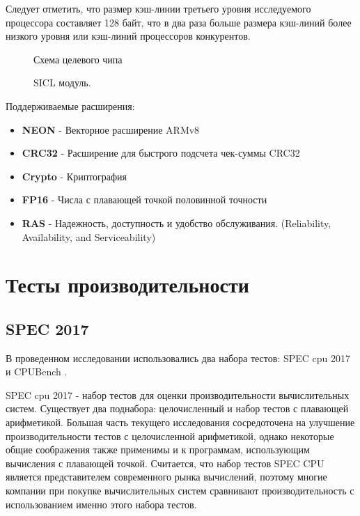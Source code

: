 Следует отметить, что размер кэш-линии третьего уровня исследуемого процессора составляет 128 байт, что в два раза больше размера кэш-линий более низкого уровня или кэш-линий процессоров конкурентов. 

\begin{figure}[htbp]
	\centering
	
	\caption{Схема целевого чипа}
	\label{chip1}
\end{figure}
\begin{figure}[htbp]
	\centering
	
	\caption{SICL модуль.}
	\label{chip2}
\end{figure}

Поддерживаемые расширения:
\begin{itemize}
	\item  \textbf{NEON} - Векторное расширение ARMv8
	\item  \textbf{CRC32} - Расширение для быстрого подсчета чек-суммы CRC32
	\item  \textbf{Crypto} - Криптография
	\item  \textbf{FP16} - Числа с плавающей точкой половинной точности
	\item  \textbf{RAS} -  Надежность, доступность и удобство обслуживания. (Reliability, Availability, and Serviceability)
\end{itemize}

\section{Тесты производительности}\label{p1:tests}
\subsection{SPEC 2017}\label{p1:tests:spec}
В проведенном исследовании использовались два набора тестов: SPEC cpu 2017 \cite{bucek2018spec} и CPUBench \cite{lu2023cpubench}. 

SPEC cpu 2017 - набор тестов для оценки производительности вычислительных систем. Существует два поднабора: целочисленный и набор тестов с плавающей арифметикой. Большая часть текущего исследования сосредоточена на улучшение производительности тестов с целочисленной арифметикой, однако некоторые общие соображения также применимы и к программам, использующим вычисления с плавающей точкой. Считается, что набор тестов SPEC CPU является представителем современного рынка вычислений, поэтому многие компании при покупке вычислительных систем сравнивают производительность с использованием именно этого набора тестов. \cite{bucek2018spec}

